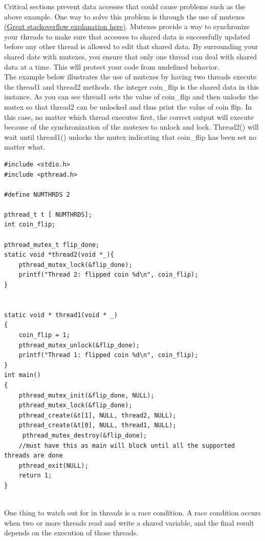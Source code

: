 Critical sections prevent data accesses that could cause problems such as the above example.  One way to solve this problem is through the use of mutexes \href{http://stackoverflow.com/questions/34524/what-is-a-mutex
}{(Great stackoverflow explanation here)}.  Mutexes provide a way to synchronize your threads to make sure that accesses to shared data is successfully updated before any other thread is allowed to edit that shared data.  By surrounding your shared date with mutexes, you ensure that only one thread can deal with shared data at a time.  This wlll protect your code from undefined behavior. \\

The example below illustrates the use of mutexes by having two threads execute the thread1 and thread2 methods.  the integer coin_flip is the shared data in this instance.  As you can see thread1 sets the value of coin_flip and then unlocks the mutex so that thread2 can be unlocked and thus print the value of coin flip.  In this case, no matter which thread executes first, the correct output will execute because of the synchronization of the mutexes to unlock and lock.  Thread2() will wait until thread1() unlocks the mutex indicating that coin_flip has been set no matter what.


\begin{lstlisting}
#include <stdio.h>
#include <pthread.h>

#define NUMTHRDS 2

pthread_t t [ NUMTHRDS];
int coin_flip;

pthread_mutex_t flip_done;
static void *thread2(void *_){
	pthread_mutex_lock(&flip_done);
	printf("Thread 2: flipped coin %d\n", coin_flip);
}


static void * thread1(void * _)
{
	coin_flip = 1;
	pthread_mutex_unlock(&flip_done);
	printf("Thread 1: flipped coin %d\n", coin_flip);
}
int main()
{
	pthread_mutex_init(&flip_done, NULL);
	pthread_mutex_lock(&flip_done);
	pthread_create(&t[1], NULL, thread2, NULL);
	pthread_create(&t[0], NULL, thread1, NULL);
	 pthread_mutex_destroy(&flip_done);
	//must have this as main will block until all the supported threads are done
	pthread_exit(NULL);
	return 1;
}


\end{lstlisting}


One thing to watch out for in threads is a race condition.  A race condition occurs when two or more threads read and write a shared variable, and the final result depends on the execution of those threads.


